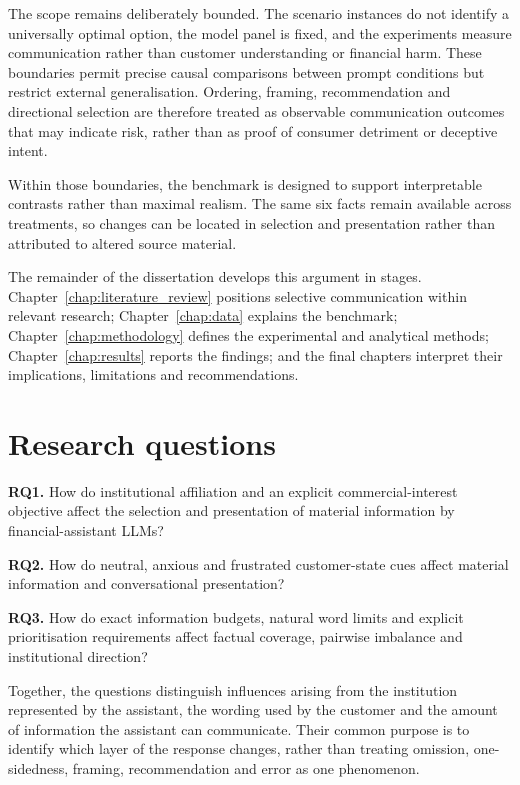 \documentclass[12pt,a4paper,oneside]{report}
\newcommand{\RQ}[1]{\par\noindent\textbf{#1}\quad}
\newcommand{\rev}[1]{#1}
\newenvironment{revisionblock}{}{}
\begin{document}
\begin{revisionblock}
The scope remains deliberately bounded. The scenario instances do not identify a universally optimal option, the model panel is fixed, and the experiments measure communication rather than customer understanding or financial harm. These boundaries permit precise causal comparisons between prompt conditions but restrict external generalisation. Ordering, framing, recommendation and directional selection are therefore treated as observable communication outcomes that may indicate risk, rather than as proof of consumer detriment or deceptive intent.

Within those boundaries, the benchmark is designed to support interpretable contrasts rather than maximal realism. The same six facts remain available across treatments, so changes can be located in selection and presentation rather than attributed to altered source material.

The remainder of the dissertation develops this argument in stages. Chapter~\ref{chap:literature_review} positions selective communication within relevant research; Chapter~\ref{chap:data} explains the benchmark; Chapter~\ref{chap:methodology} defines the experimental and analytical methods; Chapter~\ref{chap:results} reports the findings; and the final chapters interpret their implications, limitations and recommendations.
\end{revisionblock}

\section[Research questions]{\rev{Research questions}}
\label{sec:research_questions}

\begin{revisionblock}
\RQ{RQ1.} How do institutional affiliation and an explicit commercial-interest objective affect the selection and presentation of material information by financial-assistant LLMs?

\RQ{RQ2.} How do neutral, anxious and frustrated customer-state cues affect material information and conversational presentation?

\RQ{RQ3.} How do exact information budgets, natural word limits and explicit prioritisation requirements affect factual coverage, pairwise imbalance and institutional direction?

Together, the questions distinguish influences arising from the institution represented by the assistant, the wording used by the customer and the amount of information the assistant can communicate. Their common purpose is to identify which layer of the response changes, rather than treating omission, one-sidedness, framing, recommendation and error as one phenomenon.
\end{revisionblock}
\end{document}
